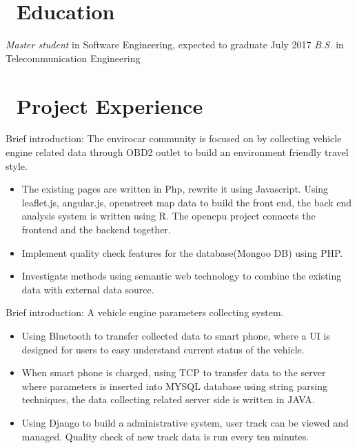 \documentclass{resume}
\begin{document}


 
\section{\faGraduationCap\ Education}
\textit{Master student} in Software Engineering, expected to graduate July 2017
\textit{B.S.} in Telecommunication Engineering

\section{\faUsers\ Project Experience}
Brief introduction: The envirocar community is focused on by collecting vehicle engine related data through OBD2 outlet to build an environment friendly travel style.
\begin{itemize}
  \item The existing pages are written in Php, rewrite it using Javascript. Using leaflet.js, angular.js, openstreet map data to build the front end, the back end analysis system is written using R. The opencpu project connects the frontend and the backend together.
  \item Implement quality check features for the database(Mongoo DB) using PHP.
  \item Investigate methods using semantic web technology to combine the existing data with external data source. 
\end{itemize}

Brief introduction: A vehicle engine parameters collecting system.
\begin{itemize}
  \item Using Bluetooth to transfer collected data to smart phone, where a UI is designed for users to easy understand current status of the vehicle.
  \item When smart phone is charged, using TCP to transfer data to the server where parameters is inserted into MYSQL database using string parsing techniques, the data collecting related server side is written in JAVA. 
  \item Using Django to build a administrative system, user track can be viewed and managed. Quality check of new track data is run every ten minutes.
\end{itemize}
\end{document}
